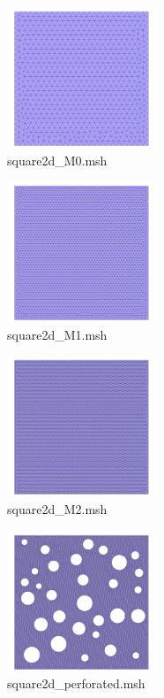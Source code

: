 \documentclass[english,10pt,a4paper]{article}
\begin{document}
\begin{multicols}{2}
  \begin{figure}[H]
  \centering
  \includegraphics[width=0.4\textwidth]{images/square2d_M0.png}
  \caption{square2d\_M0.msh}
  \label{fig:mesh_square2d_M0}
  \end{figure}
  \columnbreak
  \begin{figure}[H]
  \centering
  \includegraphics[width=0.4\textwidth]{images/square2d_M1.png}
  \caption{square2d\_M1.msh}
  \label{fig:mesh_square2d_M1}
  \end{figure}
  \end{multicols}
\begin{multicols}{2}
  \begin{figure}[H]
  \centering
  \includegraphics[width=0.4\textwidth]{images/square2d_M2.png}
  \caption{square2d\_M2.msh}
  \label{fig:mesh_square2d_M2}
  \end{figure}
  \columnbreak
  \begin{figure}[H]
  \centering
  \includegraphics[width=0.4\textwidth]{images/square2d_perforated.png}
  \caption{square2d\_perforated.msh}
  \label{fig:mesh_square2d_perforated}
  \end{figure}
\end{multicols}
\end{document}
